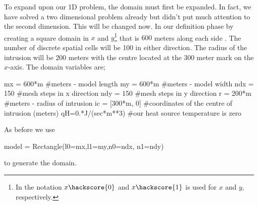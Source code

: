 To expand upon our 1D problem, the domain must first be expanded. In fact, we have solved a two dimensional problem already but didn't put much 
attention to the second dimension. This will be changed now. 
In our definition phase by creating a square domain in $x$ and $y$\footnote{In \esc the notation
$x\hackscore{0}$ and $x\hackscore{1}$ is used for $x$ and $y$, respectively.} that is $600$ meters along each side . The number of discrete spatial cells will be 100 in either direction. The radius of the intrusion will be $200$ meters with the centre located at the $300$ meter mark on the $x$-axis. The domain variables are;
\begin{python}
mx = 600*m #meters - model length
my = 600*m #meters - model width
ndx = 150 #mesh steps in x direction 
ndy = 150 #mesh steps in y direction
r = 200*m #meters - radius of intrusion
ic = [300*m, 0] #coordinates of the centre of intrusion (meters)
qH=0.*J/(sec*m**3) #our heat source temperature is zero
\end{python}
As before we use 
\begin{python}
model = Rectangle(l0=mx,l1=my,n0=ndx, n1=ndy)
\end{python}
to generate the domain. 

